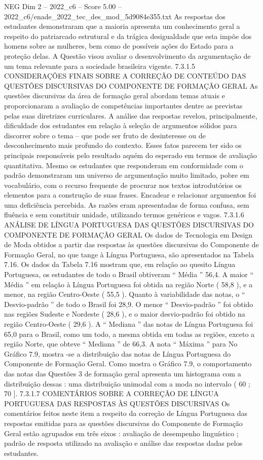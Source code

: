 \begin{textsample}{NEG Dim 2 – 2022\_c6 – Score 5.00 – 2022\_c6/enade\_2022\_tec\_des\_mod\_5d9084e355.txt}
As respostas dos estudantes demonstraram que a maioria apresenta um conhecimento geral a respeito do patriarcado estrutural e da trágica desigualdade que esta impõe dos homens sobre as mulheres, bem como de possíveis ações do Estado para a proteção delas.
A Questão visou avaliar o desenvolvimento da argumentação de um tema relevante para a sociedade brasileira vigente. 7.3.1.5 CONSIDERAÇÕES FINAIS SOBRE A CORREÇÃO DE CONTEÚDO DAS QUESTÕES DISCURSIVAS DO COMPONENTE DE FORMAÇÃO GERAL As questões discursivas da área de formação geral abordam temas atuais e proporcionaram a avaliação de competências importantes dentre as previstas pelas suas diretrizes curriculares.
A análise das respostas revelou, principalmente, dificuldade dos estudantes em relação à seleção de argumentos sólidos para discorrer sobre o tema – que pode ser fruto de desinteresse ou de desconhecimento mais profundo do contexto.
Esses fatos parecem ter sido os principais responsáveis pelo resultado aquém do esperado em termos de avaliação quantitativa.
Mesmo os estudantes que responderam em conformidade com o padrão demonstraram um universo de argumentação muito limitado, pobre em vocabulário, com o recurso frequente de procurar nos textos introdutórios os elementos para a construção de suas frases.
Encadear e relacionar argumentos foi uma deficiência percebida.
As razões eram apresentadas de forma confusa, sem fluência e sem constituir unidade, utilizando termos genéricos e vagos. 7.3.1.6 ANÁLISE DE LÍNGUA PORTUGUESA DAS QUESTÕES DISCURSIVAS DO COMPONENTE DE FORMAÇÃO GERAL Os dados de Tecnologia em Design de Moda obtidos a partir das respostas às questões discursivas do Componente de Formação Geral, no que tange à Língua Portuguesa, são apresentados na Tabela 7.16.
Os dados da Tabela 7.16 mostram que, em relação ao quesito Língua Portuguesa, os estudantes de todo o Brasil obtiveram “ Média ” 56,4.
A maior “ Média ” em relação à Língua Portuguesa foi obtida na região Norte ( 58,8 ), e a menor, na região Centro-Oeste ( 55,5 ).
Quanto à variabilidade das notas, o “ Desvio-padrão ” de todo o Brasil foi 28,9.
O menor “ Desvio-padrão ” foi obtido nas regiões Sudeste e Nordeste ( 28,6 ), e o maior desvio-padrão foi obtido na região Centro-Oeste ( 29,6 ).
A “ Mediana ” das notas de Língua Portuguesa foi 65,0 para o Brasil, como um todo, a mesma obtida em todas as regiões, exceto a região Norte, que obteve “ Mediana ” de 66,3.
A nota “ Máxima ” para No Gráfico 7.9, mostra -se a distribuição das notas de Língua Portuguesa do Componente de Formação Geral.
Como mostra o Gráfico 7.9, o comportamento das notas das Questões 3 de formação geral apresenta um histograma com a distribuição dessas : uma distribuição unimodal com a moda no intervalo ( 60 ; 70 ]. 7.3.1.7 COMENTÁRIOS SOBRE A CORREÇÃO DE LÍNGUA PORTUGUESA DAS RESPOSTAS ÀS QUESTÕES DISCURSIVAS Os comentários feitos neste item a respeito da correção de Língua Portuguesa das respostas emitidas para as questões discursivas do Componente de Formação Geral estão agrupados em três eixos : avaliação de desempenho linguístico ; padrão de resposta utilizado na avaliação e análise das respostas dadas pelos estudantes.

\end{textsample}
